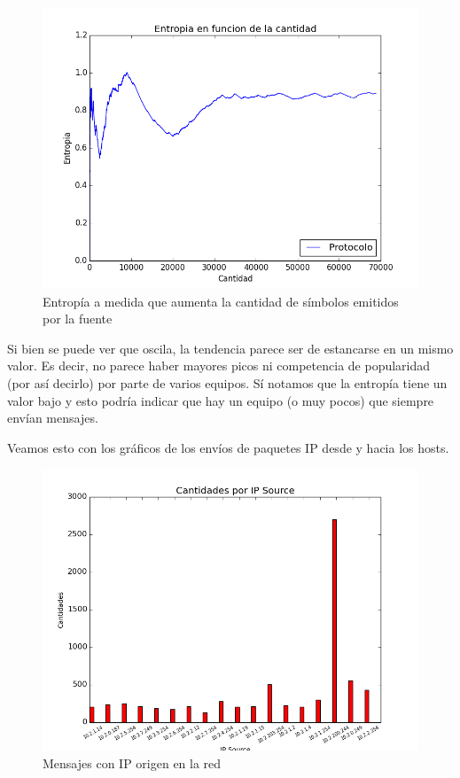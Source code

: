 \begin{figure}[h!]
\centering
\includegraphics[width=0.7\linewidth]{imagenes/exp2/3entropiaProtocolo}
\caption{Entrop\'ia a medida que aumenta la cantidad de s\'imbolos emitidos por la fuente}
\label{exp1grafico1}
\end{figure}

Si bien se puede ver que oscila, la tendencia parece ser de estancarse en un mismo valor. Es decir, no parece haber mayores picos ni competencia de popularidad (por as\'i decirlo) por parte de varios equipos. S\'i notamos que la entrop\'ia tiene un valor bajo y esto podr\'ia indicar que hay un equipo (o muy pocos) que siempre env\'ian mensajes.\newline


Veamos esto con los gr\'aficos de los env\'ios de paquetes IP desde y hacia los hosts.

\begin{figure}[h!]
\centering
\includegraphics[width=0.7\linewidth]{imagenes/exp2/4v2CantidadesIPSource100}
\caption{Mensajes con IP origen en la red}
\label{exp1grafico1}
\end{figure}

